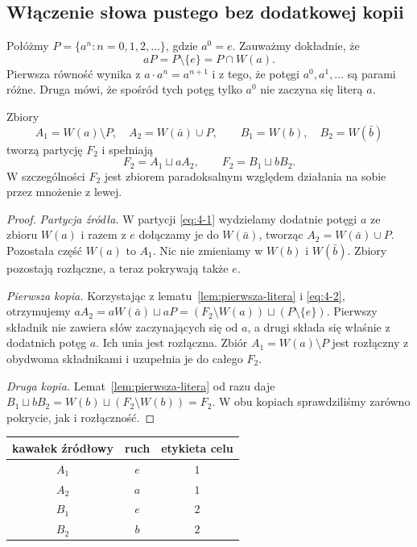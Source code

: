 \subsection{Włączenie słowa pustego bez dodatkowej kopii}
Połóżmy $P=\{a^n:n=0,1,2,\ldots\}$, gdzie $a^0=e$. Zauważmy dokładnie, że
\begin{equation}\label{eq:4-2}
 aP=P\setminus\{e\}=P\cap W(a).
\end{equation}
Pierwsza równość wynika z $a\cdot a^n=a^{n+1}$ i z tego, że potęgi $a^0,a^1,\ldots$ są parami różne. Druga mówi, że spośród tych potęg tylko $a^0$ nie zaczyna się literą $a$.
\begin{twierdzenie}\label{tw:cztery-kawalki}
Zbiory
\begin{equation}\label{eq:4-3}
 A_1=W(a)\setminus P,\quad A_2=W(\bar a)\cup P,
 \qquad B_1=W(b),\quad B_2=W(\bar b)
\end{equation}
tworzą partycję $F_2$ i spełniają
\begin{equation}\label{eq:4-4}
 F_2=A_1\sqcup aA_2,\qquad F_2=B_1\sqcup bB_2.
\end{equation}
W szczególności $F_2$ jest zbiorem paradoksalnym względem działania na sobie przez mnożenie z lewej.
\end{twierdzenie}
\begin{proof}
\emph{Partycja źródła.} W partycji \eqref{eq:4-1} wydzielamy dodatnie potęgi $a$ ze zbioru $W(a)$ i razem z $e$ dołączamy je do $W(\bar a)$, tworząc $A_2=W(\bar a)\cup P$. Pozostała część $W(a)$ to $A_1$. Nic nie zmieniamy w $W(b)$ i $W(\bar b)$. Zbiory pozostają rozłączne, a teraz pokrywają także $e$.

\emph{Pierwsza kopia.} Korzystając z lematu~\ref{lem:pierwsza-litera} i \eqref{eq:4-2}, otrzymujemy $aA_2=aW(\bar a)\sqcup aP=(F_2\setminus W(a))\sqcup(P\setminus\{e\})$. Pierwszy składnik nie zawiera słów zaczynających się od $a$, a drugi składa się właśnie z dodatnich potęg $a$. Ich unia jest rozłączna. Zbiór $A_1=W(a)\setminus P$ jest rozłączny z obydwoma składnikami i uzupełnia je do całego $F_2$.

\emph{Druga kopia.} Lemat~\ref{lem:pierwsza-litera} od razu daje $B_1\sqcup bB_2=W(b)\sqcup(F_2\setminus W(b))=F_2$. W obu kopiach sprawdziliśmy zarówno pokrycie, jak i rozłączność.
\end{proof}
\begin{center}
\begin{tabular}{c|c|c}
 kawałek źródłowy&ruch&etykieta celu\\\hline
 $A_1$&$e$&$1$\\ $A_2$&$a$&$1$\\ $B_1$&$e$&$2$\\ $B_2$&$b$&$2$
\end{tabular}
\end{center}
